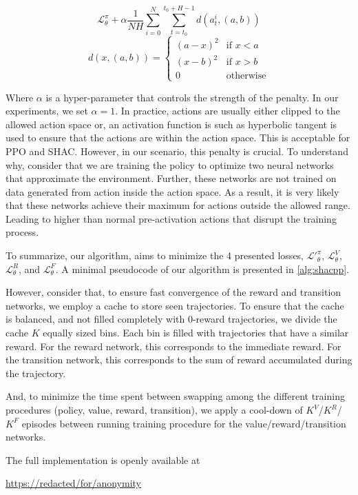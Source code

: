 $$\mathcal{L}_\theta^\pi + \alpha \frac{1}{NH}\sum_{i=0}^N\sum_{t=t_0}^{t_0+H-1} d(a_t^i,(a,b))$$
$$d(x,(a,b)) = \begin{cases}(a-x)^2 & \text{if } x < a \\ (x-b)^2 & \text{if } x > b \\ 0 & \text{otherwise} \end{cases}$$

Where $\alpha$ is a hyper-parameter that controls the strength of the penalty. In our experiments, we set $\alpha=1$. In practice, actions are usually either clipped to the allowed action space or, an activation function is such as hyperbolic tangent is used to ensure that the actions are within the action space. This is acceptable for PPO and SHAC. However, in our scenario, this penalty is crucial. To understand why, consider that we are training the policy to optimize two neural networks that approximate the environment. Further, these networks are not trained on data generated from action inside the action space. As a result, it is very likely that these networks achieve their maximum for actions outside the allowed range. Leading to higher than normal pre-activation actions that disrupt the training process.

To summarize, our algorithm, aims to minimize the 4 presented losses, $\mathcal{L'}_\theta^{\pi}$, $\mathcal{L}_\theta^V$, $\mathcal{L}_\theta^R$, and $\mathcal{L}_\theta^F$. A minimal pseudocode of our algorithm is presented in \ref{alg:shacpp}.

However, consider that, to ensure fast convergence of the reward and transition networks, we employ a cache to store seen trajectories. To ensure that the cache is balanced, and not filled completely with $0$-reward trajectories, we divide the cache $K$ equally sized bins. Each bin is filled with trajectories that have a similar reward. For the reward network, this corresponds to the immediate reward. For the transition network, this corresponds to the sum of reward accumulated during the trajectory.

And, to minimize the time spent between swapping among the different training procedures (policy, value, reward, transition), we apply a cool-down of $K^V$/$K^R$/$K^F$ episodes between running training procedure for the value/reward/transition networks. 

The full implementation is openly available at 
\begin{center}
\url{https://redacted/for/anonymity}
\end{center}

